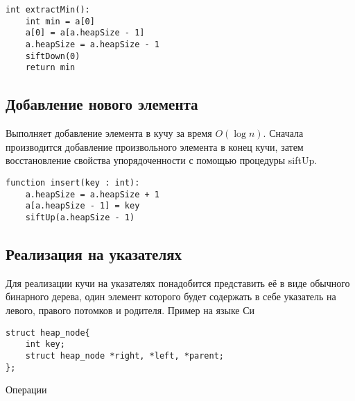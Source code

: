 \begin{verbatim}
int extractMin():
    int min = a[0]
    a[0] = a[a.heapSize - 1]
    a.heapSize = a.heapSize - 1
    siftDown(0)
    return min
\end{verbatim}

\subsection{Добавление нового элемента}

Выполняет добавление элемента в кучу за время $O(\log n)$.
Сначала производится добавление произвольного элемента в конец кучи, затем восстановление свойства упорядоченности с помощью процедуры siftUp.

\begin{verbatim}
function insert(key : int):
    a.heapSize = a.heapSize + 1
    a[a.heapSize - 1] = key
    siftUp(a.heapSize - 1)
\end{verbatim}

\subsection*{Реализация на указателях}
Для реализации кучи на указателях понадобится представить её в виде обычного бинарного дерева, один элемент которого будет содержать в себе указатель на левого, правого потомков и родителя.
Пример на языке Си

\begin{verbatim}
struct heap_node{
    int key;
    struct heap_node *right, *left, *parent;
};
\end{verbatim}

Операции